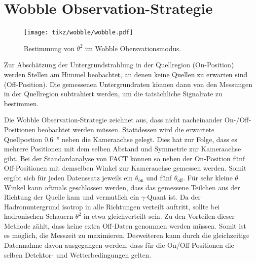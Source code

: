 \section{Wobble Observation-Strategie}
\begin{figure}
  \texttt{[image: tikz/wobble/wobble.pdf]}
  \caption{Bestimmung von $\theta^{2}$ im Wobble Obersvationsmodus.}
\end{figure}
Zur Abschätzung der Untergrundstrahlung in der Quellregion (On-Position) werden Stellen am Himmel beobachtet, an denen keine Quellen zu erwarten sind (Off-Position).
Die gemessenen Untergrundraten können dann von den Messungen in der Quellregion subtrahiert werden, um die tatsächliche Signalrate zu bestimmen.

Die Wobble Observation-Strategie zeichnet aus, dass nicht nacheinander On-/Off-Positionen beobachtet werden müssen. 
Stattdessen wird die erwartete Quellpostion \SI{0.6}{\degree} neben die Kameraachse gelegt. 
Dies hat zur Folge, dass es mehrere Positionen mit dem selben Abstand und Symmetrie zur Kameraachse gibt. 
Bei der Standardanalyse von FACT können so neben der On-Position fünf Off-Positionen mit demselben Winkel zur Kameraachse gemessen werden. 
Somit ergibt sich für jeden Datenssatz jeweils ein $\theta_\text{on}$ und fünf $\theta_\text{off}$. 
Für sehr kleine $\theta$ Winkel kann oftmals geschlossen werden, dass das gemessene Teilchen aus der Richtung der Quelle kam und vermutlich ein $\gamma$-Quant ist. 
Da der Hadronuntergrund isotrop in alle Richtungen verteilt auftritt, sollte bei hadronischen Schauern $\theta^{2}$ in etwa gleichverteilt sein. 
Zu den Vorteilen dieser Methode zählt, dass keine extra Off-Daten genommen werden müssen. 
Somit ist es möglich, die Messzeit zu maximieren. 
Desweiteren kann durch die gleichzeitige Datennahme davon ausgegangen werden, dass für die On/Off-Positionen die selben Detektor- und Wetterbedingungen gelten. 

